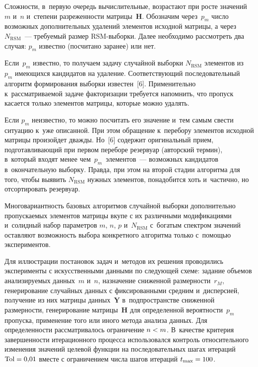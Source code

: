 \begin{multicols}{2}
     Сложности, в~первую очередь вычислительные, возрастают при росте 
значений~$m$ и~$n$ и~степени разреженности матрицы~$\mathbf{H}$. 
Обозначим через~$p_m$ число возможных дополнительных удалений 
элементов исходной матрицы, а через $N_{\mathrm{RSM}}$~--- требуемый 
размер RSM-вы\-бор\-ки. Далее необходимо рассмотреть два случая: $p_m$ 
известно (посчитано заранее) или нет.
     
     Если~$p_m$ известно, то получаем задачу случайной выборки 
$N_{\mathrm{RSM}}$ элементов из~$p_m$ имеющихся кандидатов на 
удаление. Соответствующий последовательный алгоритм формирования 
выборки из\-вес\-тен~[6]. Применительно к~рассматриваемой задаче факторизации 
требуется напомнить, что пропуск касается только элементов мат\-ри\-цы, 
которые можно удалять. 
     
     Если $p_m$ неизвестно, то можно посчитать его значение и~тем самым 
свести ситуацию к~уже описанной. При этом обращение к~перебору элементов 
исходной матрицы произойдет дважды. Но~[6] содержит оригинальный прием, 
подготавливающий при первом переборе резервуар (авторский термин), 
в~который входят менее чем~$p_m$~элементов~--- возможных кандидатов 
в~окончательную выборку. Правда, при этом на второй стадии алгоритма для 
того, чтобы выявить $N_{\mathrm{RSM}}$ нужных элементов, понадобится 
хоть и~частично, но отсортировать резервуар. 
     
     Многовариантность базовых алгоритмов случайной выборки 
дополнительно пропускаемых элементов матрицы вкупе с их различными 
модификациями и~солидный набор параметров $m$, $n$, $p$ 
и~$N_{\mathrm{RSM}}$ с~богатым спектром значений оставляют возможность 
выбора конкретного алгоритма только с~по\-мощью экспериментов.
     
     Для иллюстрации постановок задач и~методов их решения проводились 
эксперименты с искусственными данными по следующей схеме: задание 
объемов анализируемых данных~$m$ и~$n$, назначение сниженной 
размерности~$r_M$, генерирование случайных данных с фиксированными 
средним и~дисперсией, получение из них матрицы данных~$\mathbf{Y}$ 
в~подпространстве сниженной размерности, генерирование 
матрицы~$\mathbf{H}$ для определенной вероятности~$p_m$ пропуска, 
применение того или иного метода анализа данных. Для определенности 
рассматривалось ограничение $n\hm<m$. В~качестве критерия завершенности 
итерационного процесса использовался контроль относительного изменения 
значений целевой функции на последовательных шагах итераций $\mathrm{Tol}\hm= 
0{,}01$ вместе с ограничением числа шагов итераций $t_{\max}\hm= 100$.
     

\end{multicols}
